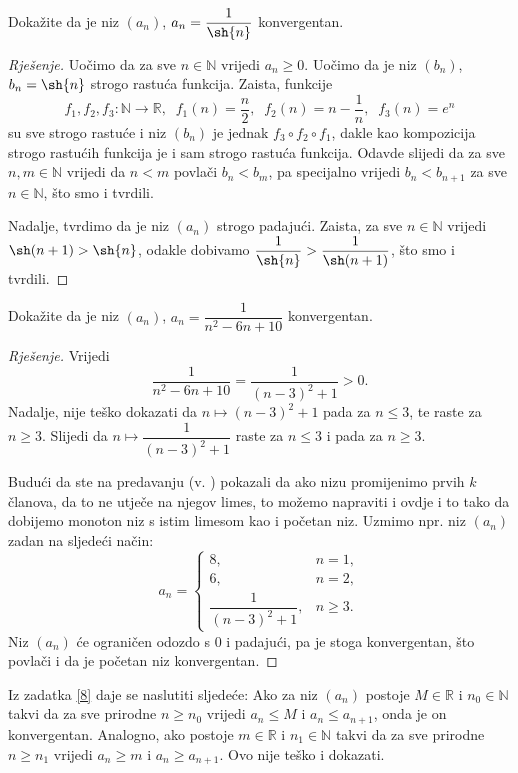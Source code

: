 \begin{exercise}
Dokažite da je niz $(a_n)$, $a_n=\dfrac{1}{\sh{n}}$ konvergentan.
\end{exercise}
\begin{proof}[Rješenje]
Uočimo da za sve $n\in \mathbb{N}$ vrijedi $a_n\geq 0$. Uočimo da je niz $(b_n)$, $b_n=\sh{n}$ strogo rastuća funkcija. Zaista, funkcije $$f_1, f_2, f_3 : \mathbb{N}\to \mathbb{R},\;\;f_1(n)=\dfrac{n}{2},\;\;f_2(n)=n-\dfrac{1}{n},\;\;f_3(n)=e^n$$ su sve strogo rastuće i niz $(b_n)$ je jednak $f_3\circ f_2\circ f_1$, dakle kao kompozicija strogo rastućih funkcija je i sam strogo rastuća funkcija. Odavde slijedi da za sve $n, m\in \mathbb{N}$ vrijedi da $n<m$ povlači $b_n<b_m$, pa specijalno vrijedi $b_n<b_{n+1}$ za sve $n\in \mathbb{N}$, što smo i tvrdili.

Nadalje, tvrdimo da je niz $(a_n)$ strogo padajući. Zaista, za sve $n\in \mathbb{N}$ vrijedi $\sh(n+1)>\sh{n}$, odakle dobivamo $\dfrac{1}{\sh{n}}>\dfrac{1}{\sh(n+1)}$, što smo i tvrdili.
\end{proof}
\begin{exercise}
\label{8}
Dokažite da je niz $(a_n)$, $a_n=\dfrac{1}{n^2-6n+10}$ konvergentan.
\end{exercise}
\begin{proof}[Rješenje]
Vrijedi
$$\dfrac{1}{n^2-6n+10}=\dfrac{1}{(n-3)^2+1}>0.$$ Nadalje, nije teško dokazati da $n\mapsto (n-3)^2+1$ pada za $n\leq 3$, te raste za $n\geq 3$. Slijedi da $n\mapsto \dfrac{1}{(n-3)^2+1}$ raste za $n\leq 3$ i pada za $n\geq 3$. 

Budući da ste na predavanju (v. \cite{3}) pokazali da ako nizu promijenimo prvih $k$ članova, da to ne utječe na njegov limes, to možemo napraviti i ovdje i to tako da dobijemo monoton niz s istim limesom kao i početan niz. Uzmimo npr. niz $(a_n)$ zadan na sljedeći način: 
$$a_n=\begin{cases}
8, & n=1,\\
6, & n=2,\\
\dfrac{1}{(n-3)^2+1}, & n\geq 3.
\end{cases}$$ 
Niz $(a_n)$ će ograničen odozdo s $0$ i padajući, pa je stoga konvergentan, što povlači i da je početan niz konvergentan.
\end{proof}
\begin{remark}
\label{generalizedsandwichtheorem}
Iz zadatka \ref{8} daje se naslutiti sljedeće: Ako za niz $(a_n)$ postoje $M\in \mathbb{R}$ i $n_0\in \mathbb{N}$ takvi da za sve prirodne $n\geq n_0$ vrijedi $a_n\leq M$ i $a_{n}\leq a_{n+1}$, onda je on konvergentan. Analogno, ako postoje $m\in \mathbb{R}$ i $n_1\in \mathbb{N}$ takvi da za sve prirodne $n\geq n_1$ vrijedi $a_n\geq m$ i $a_{n}\geq a_{n+1}$. Ovo nije teško i dokazati.
\end{remark}
